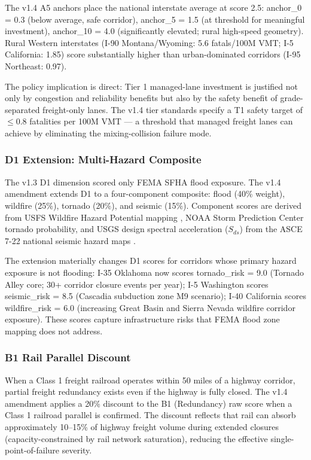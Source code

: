 The v1.4 A5 anchors place the national interstate average at score 2.5: anchor\_0 = 0.3 (below average, safe corridor), anchor\_5 = 1.5 (at threshold for meaningful investment), anchor\_10 = 4.0 (significantly elevated; rural high-speed geometry). Rural Western interstates (I-90 Montana/Wyoming: 5.6 fatals/100M VMT; I-5 California: 1.85) score substantially higher than urban-dominated corridors (I-95 Northeast: 0.97).

The policy implication is direct: Tier 1 managed-lane investment is justified not only by congestion and reliability benefits but also by the safety benefit of grade-separated freight-only lanes. The v1.4 tier standards specify a T1 safety target of $\leq 0.8$ fatalities per 100M VMT --- a threshold that managed freight lanes can achieve by eliminating the mixing-collision failure mode.

\subsubsection*{D1 Extension: Multi-Hazard Composite}

The v1.3 D1 dimension scored only FEMA SFHA flood exposure. The v1.4 amendment extends D1 to a four-component composite: flood (40\% weight), wildfire (25\%), tornado (20\%), and seismic (15\%). Component scores are derived from USFS Wildfire Hazard Potential mapping \citep{USFS_WHP2023}, NOAA Storm Prediction Center tornado probability, and USGS design spectral acceleration ($S_{ds}$) from the ASCE 7-22 national seismic hazard maps \citep{USGS_Seismic2023}.

The extension materially changes D1 scores for corridors whose primary hazard exposure is not flooding: I-35 Oklahoma now scores tornado\_risk = 9.0 (Tornado Alley core; 30+ corridor closure events per year); I-5 Washington scores seismic\_risk = 8.5 (Cascadia subduction zone M9 scenario); I-40 California scores wildfire\_risk = 6.0 (increasing Great Basin and Sierra Nevada wildfire corridor exposure). These scores capture infrastructure risks that FEMA flood zone mapping does not address.

\subsubsection*{B1 Rail Parallel Discount}

When a Class 1 freight railroad operates within 50 miles of a highway corridor, partial freight redundancy exists even if the highway is fully closed. The v1.4 amendment applies a 20\% discount to the B1 (Redundancy) raw score when a Class 1 railroad parallel is confirmed. The discount reflects that rail can absorb approximately 10--15\% of highway freight volume during extended closures (capacity-constrained by rail network saturation), reducing the effective single-point-of-failure severity.

